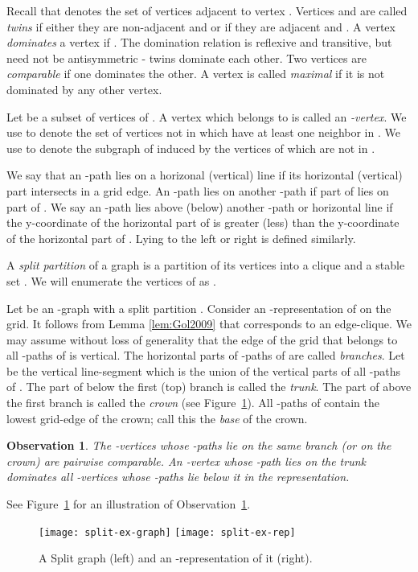 \documentclass[11pt,3p,times]{elsarticle}
\newcommand{\proofBox}{\hfill }
\newtheorem{observation}[theorem]{Observation}
\begin{document}
Recall that  denotes the set of vertices adjacent to vertex .
Vertices  and  are called {\em twins} if either they are non-adjacent
and  or if they are adjacent and .
A vertex  {\em dominates} a vertex  if . The domination relation is reflexive and transitive, but need not be
antisymmetric - twins dominate each other.   Two vertices are
{\em comparable} if one dominates the other. A vertex is called {\em maximal}
if it is not dominated by any other vertex.

Let  be a subset of vertices of . A vertex which belongs
to  is called an {\em -vertex}. We use  to denote the set of
vertices not in  which have at least one neighbor in .  We use   to denote the
subgraph of  induced by the vertices of  which are not in .


We say that an -path lies on a horizonal (vertical) line  if its horizontal (vertical) part
intersects  in a grid edge. An -path  lies on another -path  if part of 
lies on part of . We say an -path  lies above (below) another -path or horizontal
line  if the y-coordinate of the horizontal part of  is greater (less) than the y-coordinate
of the horizontal part of . Lying to the left or right is defined similarly.

A {\em split partition}  of a graph  is a partition of
its vertices into a clique  and a stable set . We will
enumerate the vertices of  as .

Let  be an -graph  with a split partition . Consider an
-representation of  on the grid. It
follows from Lemma \ref{lem:Gol2009} that  corresponds to an
edge-clique. We may assume without loss of generality that the edge of
the grid that belongs to all -paths of  is vertical. The horizontal
parts of -paths of  are called {\em branches}. Let  be the vertical
line-segment which is the union of the vertical parts of all -paths of .
The part of  below the first (top) branch is called the {\em trunk}. The
part of  above the first branch is called the {\em
crown} (see Figure~\ref{fig:L-representation}). All -paths of  contain the
lowest grid-edge of the crown; call this the {\em base} of the crown.





\begin{observation}\label{obs:comparable}
The -vertices whose -paths lie on the same branch (or
on the crown) are pairwise comparable. An -vertex whose -path lies
on the trunk dominates all -vertices whose -paths lie below it
in the representation. \proofBox
\end{observation}
See Figure~\ref{fig:L-representation} for an illustration of
Observation~\ref{obs:comparable}.
\begin{figure}[h]
\hfill
\texttt{[image: split-ex-graph]}
\hfill
\texttt{[image: split-ex-rep]}
\hfill \ \caption{A Split  graph (left) and an
-representation of it (right).}\label{fig:L-representation}
\end{figure}
\end{document}
